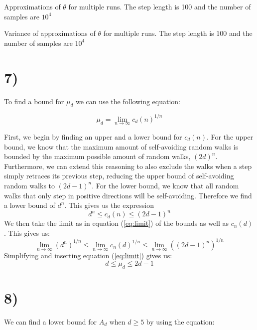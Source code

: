 \documentclass[a4paper]{article}
\begin{document}
\begin{table}[H]
    \centering
    \caption{Approximations of $\theta$ for multiple runs. The step length is 100 and the number of samples are $10^4$}
    \label{tab:multiple_theta}
    
\end{table}

\begin{table}[H]
    \centering
    \caption{Variance of approximations of $\theta$ for multiple runs. The step length is 100 and the number of samples are $10^4$}
    \label{tab:multiple_theta_variance}
    
\end{table}

\section*{7)}

To find a bound for $\mu_d$ we can use the following equation:

\begin{equation}
    \label{eq:limit}
     \mu_d = \lim_{n \to \infty} c_d(n)^{1/n}
\end{equation}


First, we begin by finding an upper and a lower bound for $c_d(n)$. For the upper bound, we know that the maximum amount of self-avoiding random walks is bounded by the maximum possible amount of random walks, $(2d)^n$. Furthermore, we can extend this reasoning to also exclude the walks when a step simply retraces its previous step, reducing the upper bound of self-avoiding random walks to $(2d-1)^n$. For the lower bound, we know that all random walks that only step in positive directions will be self-avoiding. Therefore we find a lower bound of $d^n$. This gives us the expression \begin{equation}
    d^n \leq c_d(n) \leq (2d-1)^n
\end{equation}
We then take the limit as in equation (\ref{eq:limit}) of the bounds as well as $c_n(d)$. This gives us:
\begin{equation}
    \lim_{n \to \infty} (d^n)^{1/n} \leq \lim_{n \to \infty} c_n(d)^{1/n} \leq \lim_{n \to \infty} ((2d-1)^n)^{1/n}
\end{equation}
Simplifying and inserting equation (\ref{eq:limit}) gives us:
\begin{equation}
    d \leq \mu_d \leq 2d-1
\end{equation}

\section*{8)}
We can find a lower bound for $A_d$ when $d \geq 5$ by using the equation:
\end{document}
